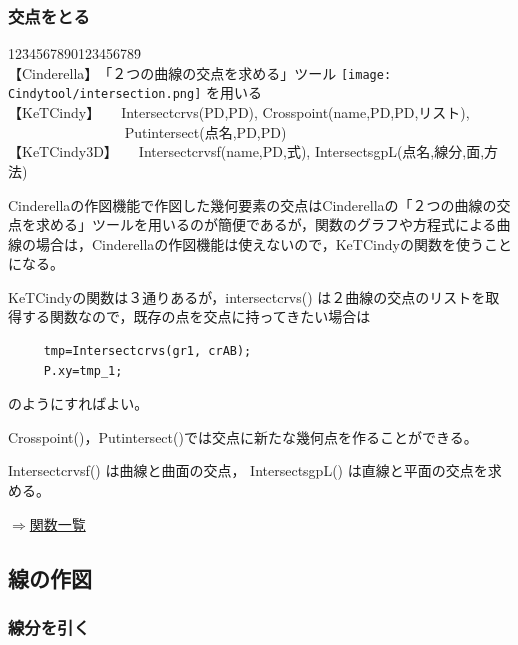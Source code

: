 \documentclass[papersize,a4paper,12pt,uplatex]{jsarticle}
\begin{document}
\subsubsection{交点をとる}
\begin{tabbing}
12\=34567890123456789\=\kill\\

\>【Cinderella】　\>「２つの曲線の交点を求める」ツール \texttt{[image: Cindytool/intersection.png]} を用いる\\ 
 \>【KeTCindy】　　\>Intersectcrvs(PD,PD), Crosspoint(name,PD,PD,リスト),\\
  \>　　　　　　　　\> Putintersect(点名,PD,PD)\\
 \>【KeTCindy3D】　　\>Intersectcrvsf(name,PD,式), IntersectsgpL(点名,線分,面,方法)\\
\end{tabbing}

Cinderellaの作図機能で作図した幾何要素の交点はCinderellaの「２つの曲線の交点を求める」ツールを用いるのが簡便であるが，関数のグラフや方程式による曲線の場合は，Cinderellaの作図機能は使えないので，KeTCindyの関数を使うことになる。

KeTCindyの関数は３通りあるが，intersectcrvs() は２曲線の交点のリストを取得する関数なので，既存の点を交点に持ってきたい場合は
\begin{verbatim}
　　　tmp=Intersectcrvs(gr1, crAB);
　　　P.xy=tmp_1;
\end{verbatim}
のようにすればよい。

Crosspoint()，Putintersect()では交点に新たな幾何点を作ることができる。

Intersectcrvsf() は曲線と曲面の交点， IntersectsgpL() は直線と平面の交点を求める。

\begin{flushright} \hyperlink{functionlist3d}{$\Rightarrow$関数一覧}\end{flushright}

\subsection{線の作図}
\subsubsection{線分を引く}
\end{document}
